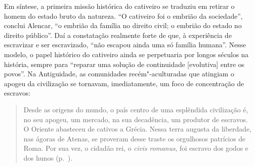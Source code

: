 Em síntese, a primeira missão histórica do cativeiro se traduziu em
retirar o homem do estado bruto da natureza. ``O cativeiro foi o embrião
da sociedade'', conclui Alencar, ``o embrião da família no direito civil;
o embrião do estado no direito público''. Daí a constatação realmente
forte de que, à  experiência de escravizar e ser escravizado, ``não
escapou ainda uma só família humana''. Nesse modelo, o papel histórico
do cativeiro ainda se perpetuaria por longos séculos na história,
sempre para ``reparar uma solução de continuidade [evolutiva] entre os
povos''. Na Antiguidade, as comunidades recém"-aculturadas que atingiam
o apogeu da civilização se tornavam, imediatamente, um foco de
concentração de escravos: 

\begin{quote}
Desde as origens do mundo, o país centro de uma esplêndida civilização 
é, no seu apogeu, um mercado, na sua decadência, um produtor de
escravos. O Oriente abasteceu de cativos a Grécia. Nessa terra augusta
da liberdade, nas ágoras de Atenas, se proveram desse traste os
orgulhosos patrícios de Roma. Por sua vez, o cidadão rei, o
\textit{civis romanus}, foi escravo dos godos e dos hunos (p.~\pageref{origem}).
\end{quote}

